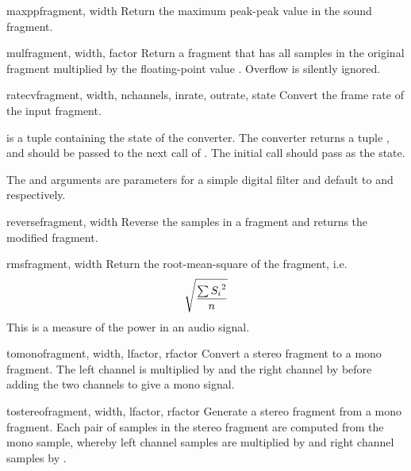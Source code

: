 \begin{funcdesc}{maxpp}{fragment, width}
Return the maximum peak-peak value in the sound fragment.
\end{funcdesc}

\begin{funcdesc}{mul}{fragment, width, factor}
Return a fragment that has all samples in the original fragment
multiplied by the floating-point value .  Overflow is
silently ignored.
\end{funcdesc}

\begin{funcdesc}{ratecv}{fragment, width, nchannels, inrate, outrate,
                         state}
Convert the frame rate of the input fragment.

 is a tuple containing the state of the converter.  The
converter returns a tuple ,
and  should be passed to the next call of
.  The initial call should pass 
as the state.

The  and  arguments are parameters for a
simple digital filter and default to  and  respectively.
\end{funcdesc}

\begin{funcdesc}{reverse}{fragment, width}
Reverse the samples in a fragment and returns the modified fragment.
\end{funcdesc}

\begin{funcdesc}{rms}{fragment, width}
Return the root-mean-square of the fragment, i.e.
\begin{displaymath}
\catcode`_=8
\sqrt{\frac{\sum{{S_{i}}^{2}}}{n}}
\end{displaymath}
This is a measure of the power in an audio signal.
\end{funcdesc}

\begin{funcdesc}{tomono}{fragment, width, lfactor, rfactor} 
Convert a stereo fragment to a mono fragment.  The left channel is
multiplied by  and the right channel by 
before adding the two channels to give a mono signal.
\end{funcdesc}

\begin{funcdesc}{tostereo}{fragment, width, lfactor, rfactor}
Generate a stereo fragment from a mono fragment.  Each pair of samples
in the stereo fragment are computed from the mono sample, whereby left
channel samples are multiplied by  and right channel
samples by .
\end{funcdesc}

